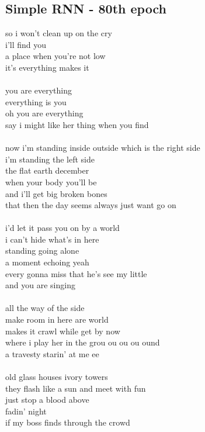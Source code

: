 \documentclass[conference]{IEEEtran}
\begin{document}
\subsection{Simple RNN - 80th epoch}\label{RNN80}
so i won't clean up on the cry \\
i'll find you \\
a place when you're not low \\
it's everything makes it \\
\\
you are everything \\
everything is you \\
oh you are everything \\
say i might like her thing when you find \\
\\
now i'm standing inside outside which is the right side \\
i'm standing the left side \\
the flat earth december \\
when your body you'll be \\
and i'll get big broken bones \\
that then the day seems always just want go on \\
\\
i'd let it pass you on by a world \\
i can't hide what's in here \\
standing going alone \\
a moment echoing yeah \\
every gonna miss that he's see my little \\
and you are singing \\
\\
all the way of the side \\
make room in here are world \\
makes it crawl while get by now \\
where i play her in the grou ou ou ou ound \\
a travesty starin' at me ee \\
\\
old glass houses ivory towers \\
they flash like a sun and meet with fun \\
just stop a blood above \\
fadin' night \\
if my boss finds through the crowd \\
\\
\end{document}
